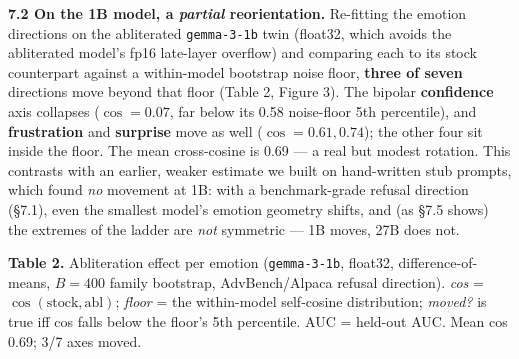 \documentclass[
]{article}
\begin{document}
\textbf{7.2 On the 1B model, a \emph{partial} reorientation.} Re-fitting
the emotion directions on the abliterated \texttt{gemma-3-1b} twin
(float32, which avoids the abliterated model's fp16 late-layer overflow)
and comparing each to its stock counterpart against a within-model
bootstrap noise floor, \textbf{three of seven} directions move beyond
that floor (Table 2, Figure 3). The bipolar \textbf{confidence} axis
collapses (\(\cos = 0.07\), far below its 0.58 noise-floor 5th
percentile), and \textbf{frustration} and \textbf{surprise} move as well
(\(\cos = 0.61, 0.74\)); the other four sit inside the floor. The mean
cross-cosine is 0.69 --- a real but modest rotation. This contrasts with
an earlier, weaker estimate we built on hand-written stub prompts, which
found \emph{no} movement at 1B: with a benchmark-grade refusal direction
(§7.1), even the smallest model's emotion geometry shifts, and (as §7.5
shows) the extremes of the ladder are \emph{not} symmetric --- 1B moves,
27B does not.

\textbf{Table 2.} Abliteration effect per emotion (\texttt{gemma-3-1b},
float32, difference-of-means, \(B=400\) family bootstrap,
AdvBench/Alpaca refusal direction). \emph{cos} =
\(\cos(\text{stock},\text{abl})\); \emph{floor} = the within-model
self-cosine distribution; \emph{moved?} is true iff cos falls below the
floor's 5th percentile. AUC = held-out AUC. Mean cos 0.69; 3/7 axes
moved.
\end{document}
